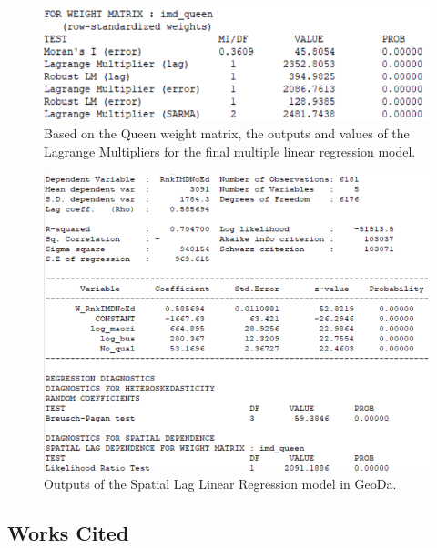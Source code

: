 \documentclass[
  letterpaper,
  DIV=11,
  numbers=noendperiod,
  oneside]{scrartcl}
\begin{document}
\begin{figure}

{\centering \includegraphics{Spatial model stuff.png}

}

\caption{\label{fig-spatial}Based on the Queen weight matrix, the
outputs and values of the Lagrange Multipliers for the final multiple
linear regression model.}

\end{figure}

\begin{figure}

{\centering \includegraphics{Spatial lag regression.png}

}

\caption{\label{fig-spatiallag}Outputs of the Spatial Lag Linear
Regression model in GeoDa.}

\end{figure}

\hypertarget{works-cited}{%
\subsection*{Works Cited}\label{works-cited}}
\end{document}
